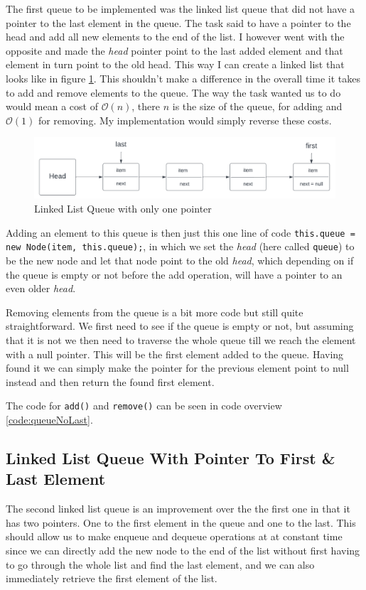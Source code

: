 \documentclass[a4paper,11pt]{article}
\begin{document}
The first queue to be implemented was the linked list queue that did not have a pointer to the last element in the queue. The task
said to have a pointer to the head and add all new elements to the end of the list. I however went with the opposite and made the \textit{head}
pointer point to the last added element and that element in turn point to the old head. This way I can create a linked list that looks like in
figure \ref{fig:queueNoLast}. This shouldn't make a difference in the overall time it takes to add and remove elements to the queue. The way the task wanted
us to do would mean a cost of $\mathcal{O}(n)$, there $n$ is the size of the queue, for adding and $\mathcal{O}(1)$ for removing. My implementation would
simply reverse these costs.
\begin{figure}[h!]
    \centering
    \includegraphics[width=.9\textwidth]{queue-no-last.pdf}
    \caption{Linked List Queue with only one pointer}
    \label{fig:queueNoLast}
\end{figure}

Adding an element to this queue is then just this one line of code {\tt this.queue = new Node(item, this.queue);}, in which we set the \textit{head} (here
called {\tt queue}) to be the new node and let that node point to the old \textit{head}, which depending on if the queue is empty or not before the add operation,
will have a pointer to an even older \textit{head}.

Removing elements from the queue is a bit more code but still quite straightforward. We first need to see if the queue is empty or not, but assuming that it is not
we then need to traverse the whole queue till we reach the element with a null pointer. This will be the first element added to the queue. Having found it we can
simply make the pointer for the previous element point to null instead and then return the found first element.

The code for {\tt add()} and {\tt remove()} can be seen in code overview \ref{code:queueNoLast}.

\subsection{Linked List Queue With Pointer To First \& Last Element}
The second linked list queue is an improvement over the the first one in that it has two pointers. One to the first element in the queue and one to the last.
This should allow us to make enqueue and dequeue operations at at constant time since we can directly add the new node to the end of the list without first having
to go through the whole list and find the last element, and we can also immediately retrieve the first element of the list.
\end{document}

